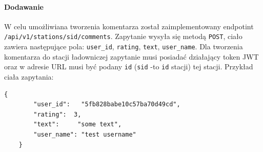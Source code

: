 \paragraph{Dodawanie\newline}
W celu umożliwiana tworzenia komentarza został zaimplementowany endpotint \texttt{/api/v1/stations/{sid}/comments}.
Zapytanie wysyła się metodą \texttt{POST}, ciało zawiera następujące pola: \texttt{user\_id}, \texttt{rating}, \texttt{text}, \texttt{user\_name}.
Dla tworzenia komentarza do stacji ładowniczej zapytanie musi posiadać działający token JWT oraz w adresie URL musi być podany \texttt{id} (\texttt{sid} -to \texttt{id} stacji) tej stacji.
Przykład ciała zapytania:
\begin{lstlisting}[basicstyle=\tiny\ttfamily]
    {
		"user_id":   "5fb828babe10c57ba70d49cd",
		"rating":  3,
		"text":     "some text",
		"user_name": "test username"
    }
\end{lstlisting}

